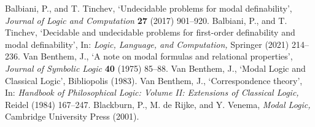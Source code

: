 \documentclass[draft]{article}
\def\S{\mathbf{S}}
\def\KD{\mathbf{KD}}
\def\Alt{\mathbf{Alt}}
\begin{document}
\begin{thebibliography}{}
%
%
{\sc Balbiani,} P., and T. {\sc Tinchev,}
`Undecidable problems for modal definability',
\emph{Journal of Logic and Computation}\/ {\bf 27} (2017) 901--920.
%
%
%
%
{\sc Balbiani,} P., and T. {\sc Tinchev,}
`Decidable and undecidable problems for first-order definability and modal definability',
In: \emph{Logic, Language, and Computation,}\/
Springer (2021) 214--236.
%
%
%
%
%
%
{\sc Van Benthem,} J.,
`A note on modal formulas and relational properties',
\emph{Journal of Symbolic Logic}\/ {\bf 40} (1975) 85--88.
%
%
{\sc Van Benthem,} J.,
`Modal Logic and Classical Logic',
Bibliopolis (1983).
%
%
{\sc Van Benthem,} J.,
`Correspondence theory',
In: \emph{Handbook of Philosophical Logic: Volume II: Extensions of Classical Logic,}\/
Reidel (1984) 167--247.
%
%
%
%
%
%
{\sc Blackburn,} P., M. {\sc de Rijke,} and Y. {\sc Venema,}
\emph{Modal Logic,}\/
Cambridge University Press (2001).
%
%
%
%
%
%

\end{thebibliography}
\end{document}

